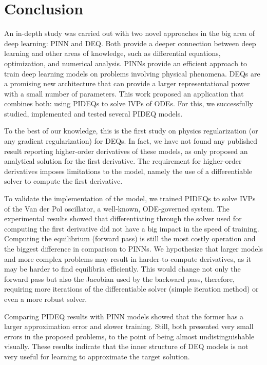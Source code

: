 \chapter{Conclusion}\label{ch:conclusion}

An in-depth study was carried out with two novel approaches in the big area of deep learning: \gls{PINN} and {DEQ}.
Both provide a deeper connection between deep learning and other areas of knowledge, such as differential equations, optimization, and numerical analysis.
\gls{PINN}s provide an efficient approach to train deep learning models on problems involving physical phenomena.
\gls{DEQ}s are a promising new architecture that can provide a larger representational power with a small number of parameters.
This work proposed an application that combines both: using \gls{PIDEQ}s to solve \gls{IVP}s of \gls{ODE}s.
For this, we successfully studied, implemented and tested several \gls{PIDEQ} models.

To the best of our knowledge, this is the first study on physics regularization (or any gradient regularization) for \gls{DEQ}s.
In fact, we have not found any published result reporting higher-order derivatives of these models, as \textcite{Bai2019} only proposed an analytical solution for the first derivative.
The requirement for higher-order derivatives imposes limitations to the model, namely the use of a differentiable solver to compute the first derivative.

To validate the implementation of the model, we trained \gls{PIDEQ}s to solve \gls{IVP}s of the Van der Pol oscillator, a well-known, \gls{ODE}-governed system.
The experimental results showed that differentiating through the solver used for computing the first derivative did not have a big impact in the speed of training.
Computing the equilibrium (forward pass) is still the most costly operation and the biggest difference in comparison to \gls{PINN}s.
We hypothesize that larger models and more complex problems may result in harder-to-compute derivatives, as it may be harder to find equilibria efficiently.
This would change not only the forward pass but also the Jacobian used by the backward pass, therefore, requiring more iterations of the differentiable solver (simple iteration method) or even a more robust solver.

Comparing \gls{PIDEQ} results with \gls{PINN} models showed that the former has a larger approximation error and slower training.
Still, both presented very small errors in the proposed problems, to the point of being almost undistinguishable visually.
These results indicate that the inner structure of \gls{DEQ} models is not very useful for learning to approximate the target solution.


